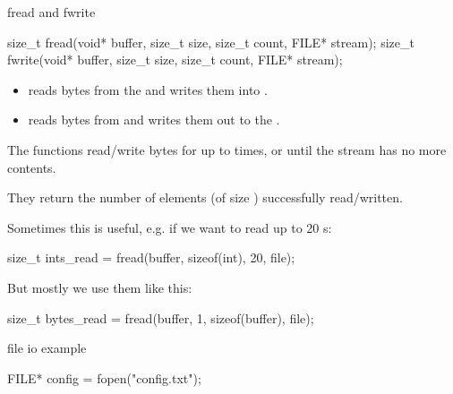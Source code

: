 \documentclass[10pt,graphics,aspectratio=169,table]{beamer}
\begin{document}
\begin{frame}[fragile]{fread and fwrite}
    \begin{small}

    \begin{codeblock}[numbers=none, basicstyle=\small]
size_t fread(void* buffer, size_t size, size_t count, FILE* stream);
size_t fwrite(void* buffer, size_t size, size_t count, FILE* stream);
    \end{codeblock}

    \begin{itemize}
        \item {} reads bytes from the  and writes them into 
        .  

        \item {} reads bytes from  and writes them out to the 
        . 
    
    \end{itemize}

    The functions read/write  bytes for up to  times, or until 
    the stream has no more contents.

    They return the number of elements 
    (of size ) successfully read/written.

    Sometimes this is useful, e.g. if we want to read up to 20 s:
    \begin{codeblock}[numbers=none, basicstyle=\small]
size_t ints_read = fread(buffer, sizeof(int), 20, file);
    \end{codeblock}

    But mostly we use them like this:
    \begin{codeblock}[numbers=none, basicstyle=\small]
size_t bytes_read = fread(buffer, 1, sizeof(buffer), file);
    \end{codeblock}

    \end{small}
\end{frame}

\begin{frame}[fragile]{file io example}
    
    \begin{codeblock}
FILE* config = fopen("config.txt"); 

    \end{codeblock}

\end{frame}
\end{document}
